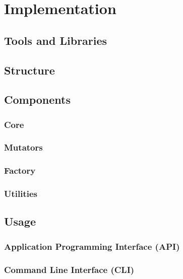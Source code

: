 
\chapter{Implementation}
\label{cha:implementation}

\section{Tools and Libraries}
\label{sec:tools-libraries}

\section{Structure}
\label{sec:structure}

\section{Components}
\label{sec:components}

\subsection{Core}
\label{sec:core}

\subsection{Mutators}
\label{sec:mutators}

\subsection{Factory}
\label{sec:factory}

\subsection{Utilities}
\label{sec:utilities}

\section{Usage}
\label{sec:usage}

\subsection{Application Programming Interface (API)}
\label{sec:usage-api}

\subsection{Command Line Interface (CLI)}
\label{sec:usage-cli}